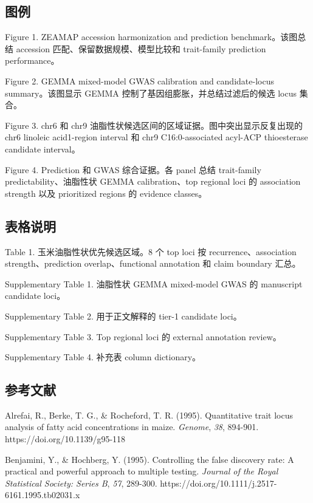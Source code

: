\documentclass[
]{article}
\begin{document}
\subsection{图例}\label{ux56feux4f8b}

Figure 1. ZEAMAP accession harmonization and prediction
benchmark。该图总结 accession 匹配、保留数据规模、模型比较和
trait-family prediction performance。

Figure 2. GEMMA mixed-model GWAS calibration and candidate-locus
summary。该图显示 GEMMA 控制了基因组膨胀，并总结过滤后的候选 locus
集合。

Figure 3. chr6 和 chr9
油脂性状候选区间的区域证据。图中突出显示反复出现的 chr6 linoleic
acid1-region interval 和 chr9 C16:0-associated acyl-ACP thioesterase
candidate interval。

Figure 4. Prediction 和 GWAS 综合证据。各 panel 总结 trait-family
predictability、油脂性状 GEMMA calibration、top regional loci 的
association strength 以及 prioritized regions 的 evidence classes。

\subsection{表格说明}\label{ux8868ux683cux8bf4ux660e}

Table 1. 玉米油脂性状优先候选区域。8 个 top loci 按
recurrence、association strength、prediction overlap、functional
annotation 和 claim boundary 汇总。

Supplementary Table 1. 油脂性状 GEMMA mixed-model GWAS 的 manuscript
candidate loci。

Supplementary Table 2. 用于正文解释的 tier-1 candidate loci。

Supplementary Table 3. Top regional loci 的 external annotation review。

Supplementary Table 4. 补充表 column dictionary。

\subsection{参考文献}\label{ux53c2ux8003ux6587ux732e}

Alrefai, R., Berke, T. G., \& Rocheford, T. R. (1995). Quantitative
trait locus analysis of fatty acid concentrations in maize.
\emph{Genome}, \emph{38}, 894-901. https://doi.org/10.1139/g95-118

Benjamini, Y., \& Hochberg, Y. (1995). Controlling the false discovery
rate: A practical and powerful approach to multiple testing.
\emph{Journal of the Royal Statistical Society: Series B}, \emph{57},
289-300. https://doi.org/10.1111/j.2517-6161.1995.tb02031.x
\end{document}
